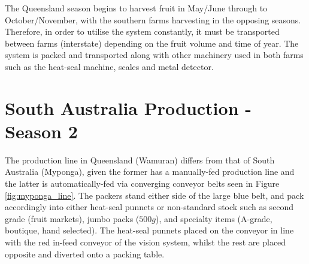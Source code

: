 \documentclass[fleqn,twoside,12pt]{report}
\begin{document}
The Queensland season begins to harvest fruit in May/June through to October/November, with the southern farms harvesting in the opposing seasons. Therefore, in order to utilise the system constantly, it must be transported between farms (interstate) depending on the fruit volume and time of year. The system is packed and transported along with other machinery used in both farms such as the heat-seal machine, scales and metal detector. 



\section{South Australia Production - Season 2}


The production line in Queensland (Wamuran) differs from that of South Australia (Myponga), given the former has a manually-fed production line and the latter is automatically-fed via converging conveyor belts seen in Figure \ref{fig:myponga_line}. The packers stand either side of the large blue belt, and pack accordingly into either heat-seal punnets or non-standard stock such as second grade (fruit markets), jumbo packs ($500g$), and specialty items (A-grade, boutique, hand selected). The heat-seal punnets placed on the conveyor in line with the red in-feed conveyor of the vision system, whilst the rest are placed opposite and diverted onto a packing table. 
\end{document}
